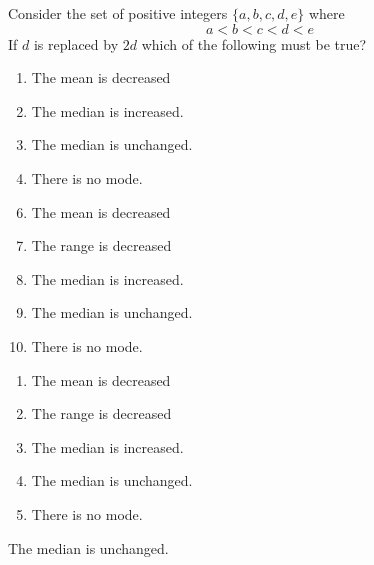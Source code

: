 


  Consider the set of positive integers $\{a,b,c,d,e\}$ where
\[a<b<c<d<e\]
If $d$ is replaced by $2d$ which of the following must be true?


\ifsat
	\begin{enumerate}[label=\Alph*)]
		\item   The mean is decreased
		\item  The median is increased.
		\item  The median is unchanged.%
		\item  There is no mode.
	\end{enumerate}
\else
\fi

\ifacteven
	\begin{enumerate}[label=\textbf{\Alph*.},itemsep=\fill,align=left]
		\setcounter{enumii}{5}
		\item   The mean is decreased
		\item  The range is decreased
		\item  The median is increased.
		\addtocounter{enumii}{1}
		\item  The median is unchanged.%
		\item  There is no mode.
	\end{enumerate}
\else
\fi

\ifactodd
	\begin{enumerate}[label=\textbf{\Alph*.},itemsep=\fill,align=left]
		\item   The mean is decreased
		\item  The range is decreased
		\item  The median is increased.
		\item  The median is unchanged.%
		\item  There is no mode.
	\end{enumerate}
\else
\fi

\ifgridin
  The median is unchanged.%
		
\else
\fi

